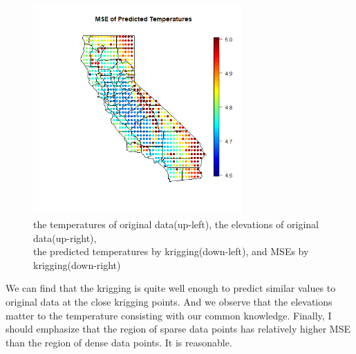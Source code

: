 \documentclass{article}
\begin{document}
\begin{figure}[!h]
    \includegraphics[height=8cm]{prob2_CAgrid_predicted_MSE.png}
    \caption{the temperatures of original data(up-left), the elevations of original data(up-right),
    \\ the predicted temperatures by krigging(down-left), and MSEs by krigging(down-right)}
\end{figure}

We can find that the krigging is quite well enough to predict similar values to original data
at the close krigging points.
And we observe that the elevations matter to the temperature consisting with our common knowledge.
Finally, I should emphasize that the region of sparse data points has relatively higher MSE
than the region of dense data points. It is reasonable.
\end{document}

